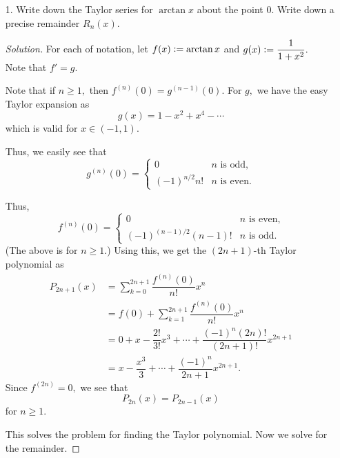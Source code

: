 \documentclass[12pt]{article}
\theoremstyle{definition}
\newenvironment{soln}{\begin{proof}[Solution]}{\end{proof}}
\begin{document}
\begin{itemize}
		\item[1.] Write down the Taylor series for $\arctan x$ about the point $0.$ Write down a precise remainder $R_n(x).$
		\begin{soln}
			For each of notation, let $f(x) \vcentcolon= \arctan x$ and $g(x) \vcentcolon= \dfrac{1}{1 + x^2}.$\\
			Note that $f' = g.$

			Note that if $n \ge 1,$ then $f^{(n)}(0) = g^{(n - 1)}(0).$ For $g,$ we have the easy Taylor expansion as
			\begin{equation*} 
				g(x) = 1 - x^2 + x^4 - \cdots
			\end{equation*}
			which is valid for $x \in (-1, 1).$

			Thus, we easily see that
			\begin{equation*} 
				g^{(n)}(0) = \begin{cases}
					0 & n \text{ is odd,}\\
					(-1)^{n/2}n! & n \text{ is even.}
				\end{cases}
			\end{equation*}

			Thus,
			\begin{equation*} 
				f^{(n)}(0) = \begin{cases}
					0 & n \text{ is even,}\\
					(-1)^{(n - 1)/2}(n - 1)! & n \text{ is odd.}
				\end{cases}
			\end{equation*}
			(The above is for $n \ge 1.$)
			Using this, we get the $(2n + 1)$-th Taylor polynomial as
			\begin{align*} 
				P_{2n + 1}(x) &= \sum_{k = 0}^{2n + 1}\dfrac{f^{(n)}(0)}{n!}x^n\\
				&= f(0) + \sum_{k = 1}^{2n + 1}\dfrac{f^{(n)}(0)}{n!}x^n\\
				&= 0 + x - \dfrac{2!}{3!}x^3 + \cdots + \dfrac{(-1)^n(2n)!}{(2n + 1)!}x^{2n + 1}\\
				&= x - \dfrac{x^3}{3} + \cdots + \dfrac{(-1)^n}{2n + 1}x^{2n + 1}.
			\end{align*}
			Since $f^{(2n)} = 0,$ we see that
			\begin{equation*} 
				P_{2n}(x) = P_{2n - 1}(x)
			\end{equation*}
			for $n \ge 1.$

			This solves the problem for finding the Taylor polynomial. Now we solve for the remainder.


\end{soln}
\end{itemize}
\end{document}
